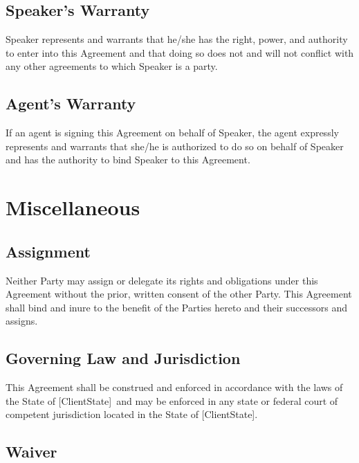 \documentclass[a4paper,12pt]{article} %
\newcommand{\ClientState}{[ClientState]}
\begin{document}
\subsection{Speaker's Warranty}

Speaker represents and warrants that he/she has the right, power, and authority to enter into this Agreement and that doing so does not and will not conflict with any other agreements to which Speaker is a party.

\subsection{Agent's Warranty}

If an agent is signing this Agreement on behalf of Speaker, the agent expressly represents and warrants that she/he is authorized to do so on behalf of Speaker and has the authority to bind Speaker to this Agreement.



\section{Miscellaneous}

\subsection{Assignment}

Neither Party may assign or delegate its rights and obligations under this Agreement without the prior, written consent of the other Party. This Agreement shall bind and inure to the benefit of the Parties hereto and their successors and assigns.

\subsection{Governing Law and Jurisdiction}

This Agreement shall be construed and enforced in accordance with the laws of the State of \ClientState ~and may be enforced in any state or federal court of competent jurisdiction located in the State of \ClientState.

\subsection{Waiver}
\end{document}
